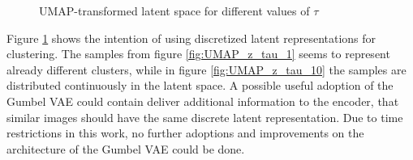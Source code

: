 \documentclass[12pt,DIV14,BCOR12mm,a4paper,footexclude,headinclude,halfparskip-,twoside,openright,cleardoubleempty,idxtotoc,bibtotoc,listtotoc]{scrreprt} %
\numberwithin{equation}{chapter}
\begin{document}
	\begin{figure}[htb!]
	\centering
	\qquad
	\qquad
	\qquad
	\qquad
	\caption{UMAP-transformed latent space for different values of $\tau$}
	\label{fig:Different_GumbelTemperatures_UMAP}
\end{figure}
Figure \ref{fig:Different_GumbelTemperatures_UMAP} shows the intention of using discretized latent representations for clustering. The samples from figure \ref{fig:UMAP_z_tau_1} seems to represent already different clusters, while in figure \ref{fig:UMAP_z_tau_10} the samples are distributed continuously in the latent space. A possible useful adoption of the Gumbel VAE could contain deliver additional information to the encoder, that similar images should have the same discrete latent representation. Due to time restrictions in this work, no further adoptions and improvements on the architecture of the Gumbel VAE could be done.\\
\end{document}
